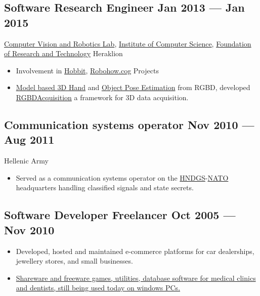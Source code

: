 \documentclass[a4,8pt]{article}
\newcommand{\subtext}[1]{
#1\par\vspace{-0.2cm}}
\newenvironment{zitemize}{
\begin{itemize}\itemsep0pt \parskip0pt \parsep1pt}
{\end{itemize}\vspace{-0.5cm}}
\begin{document}
\subsection*{Software Research Engineer \hfill Jan 2013 --- Jan 2015} 
\subtext{\href{https://www.ics.forth.gr/cvrl/}{Computer Vision and Robotics Lab}, \href{https://www.ics.forth.gr/}{Institute of Computer Science}, \href{https://www.forth.gr/}{Foundation of Research and Technology}  \hfill Heraklion} 
    \begin{zitemize}
        \item Involvement in \href{http://hobbit.acin.tuwien.ac.at/}{Hobbit}, \href{https://cordis.europa.eu/docs/projects/cnect/3/288533/080/deliverables/001-d21.pdf}{Robohow.cog} Projects  
        \item \href{http://users.ics.forth.gr/~argyros/mypapers/2015_06_CVPR_fsv.pdf}{Model based 3D Hand} and \href{http://users.ics.forth.gr/~argyros/mypapers/2015_09_BMVC_fect.pdf}{Object Pose Estimation} from RGBD, developed \href{https://github.com/AmmarkoV/RGBDAcquisition/}{RGBDAcquisition} a framework for 3D data acquisition.
    \end{zitemize}

\subsection*{Communication systems operator \hfill Nov 2010 --- Aug 2011} 
\subtext{Hellenic Army} 
    \begin{zitemize}
        \item Served as a communication systems operator on the \href{https://geetha.mil.gr/en/}{HNDGS}-\href{https://www.nato.int/}{NATO} headquarters handling classified signals and state secrets. 
    \end{zitemize}

\subsection*{Software Developer Freelancer \hfill Oct 2005 --- Nov 2010}  
    \begin{zitemize}
        \item Developed, hosted and maintained e-commerce platforms for car dealerships, jewellery stores, and small businesses. 
        \item \href{http://ammar.gr/~ammar/atech_old/Myshop/database.php}{Shareware and freeware games, utilities, database software for medical clinics and dentists, still being used today on windows PCs.}
    \end{zitemize}
\linespread{0.82} 
\end{document}

